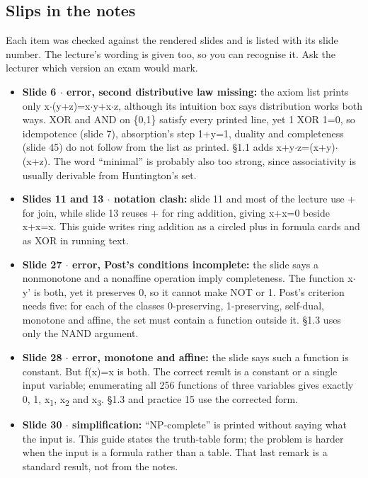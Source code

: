 \documentclass[11pt]{article}
\begin{document}
\begin{keepsection}
\section{Slips in the notes}

Each item was checked against the rendered slides and is listed with its slide number. The lecture’s wording is given too, so you can recognise it. Ask the lecturer which version an exam would mark.

\begin{itemize}
\item \textbf{Slide 6 \ensuremath{\cdot} error, second distributive law missing:} the axiom list prints only x\ensuremath{\cdot}(y+z)=x\ensuremath{\cdot}y+x\ensuremath{\cdot}z, although its intuition box says distribution works both ways. XOR and AND on \{0,1\} satisfy every printed line, yet 1 XOR 1=0, so idempotence (slide 7), absorption’s step 1+y=1, duality and completeness (slide 45) do not follow from the list as printed. §1.1 adds x+y\ensuremath{\cdot}z=(x+y)\ensuremath{\cdot}(x+z). The word “minimal” is probably also too strong, since associativity is usually derivable from Huntington’s set.
\item \textbf{Slides 11 and 13 \ensuremath{\cdot} notation clash:} slide 11 and most of the lecture use + for join, while slide 13 reuses + for ring addition, giving x+x=0 beside x+x=x. This guide writes ring addition as a circled plus in formula cards and as XOR in running text.
\item \textbf{Slide 27 \ensuremath{\cdot} error, Post’s conditions incomplete:} the slide says a nonmonotone and a nonaffine operation imply completeness. The function x\ensuremath{\cdot}y' is both, yet it preserves 0, so it cannot make NOT or 1. Post’s criterion needs five: for each of the classes 0-preserving, 1-preserving, self-dual, monotone and affine, the set must contain a function outside it. §1.3 uses only the NAND argument.
\item \textbf{Slide 28 \ensuremath{\cdot} error, monotone and affine:} the slide says such a function is constant. But f(x)=x is both. The correct result is a constant or a single input variable; enumerating all 256 functions of three variables gives exactly 0, 1, x\textsubscript{1}, x\textsubscript{2} and x\textsubscript{3}. §1.3 and practice 15 use the corrected form.
\item \textbf{Slide 30 \ensuremath{\cdot} simplification:} “NP-complete” is printed without saying what the input is. This guide states the truth-table form; the problem is harder when the input is a formula rather than a table. That last remark is a standard result, not from the notes.

\end{itemize}
\end{keepsection}
\end{document}
